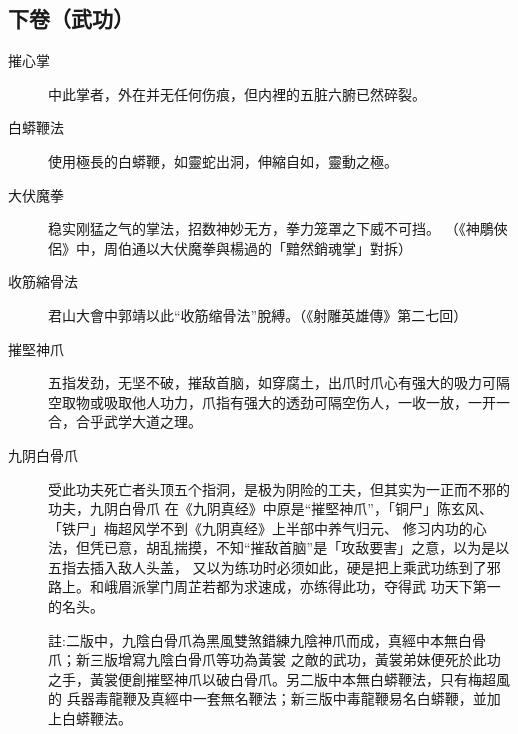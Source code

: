 \subsection{下卷（武功）}
\begin{description}
\item[摧心掌] 中此掌者，外在并无任何伤痕，但内裡的五脏六腑已然碎裂。
\item[白蟒鞭法] 使用極長的白蟒鞭，如靈蛇出洞，伸縮自如，靈動之極。
\item[大伏魔拳] 稳实刚猛之气的掌法，招数神妙无方，拳力笼罩之下威不可挡。 （《神鵰俠侶》中，周伯通以大伏魔拳與楊過的「黯然銷魂掌」對拆）
\item[收筋縮骨法] 君山大會中郭靖以此“收筋缩骨法”脫縛。（《射雕英雄傳》第二七回\cite{shediao}）
\item[摧堅神爪] 五指发劲，无坚不破，摧敌首脑，如穿腐土，出爪时爪心有强大的吸力可隔空取物或吸取他人功力，爪指有强大的透劲可隔空伤人，一收一放，一开一合，合乎武学大道之理。
\item[九阴白骨爪] 受此功夫死亡者头顶五个指洞，是极为阴险的工夫，但其实为一正而不邪的功夫，九阴白骨爪
  在《九阴真经》中原是“摧堅神爪”，「铜尸」陈玄风、「铁尸」梅超风学不到《九阴真经》上半部中养气归元、
  修习内功的心法，但凭已意，胡乱揣摸，不知“摧敌首脑”是「攻敌要害」之意，以为是以五指去插入敌人头盖，
  又以为练功时必须如此，硬是把上乘武功练到了邪路上。和峨眉派掌门周芷若都为求速成，亦练得此功，夺得武
  功天下第一的名头。

  註:二版中，九陰白骨爪為黑風雙煞錯練九陰神爪而成，真經中本無白骨爪；新三版增寫九陰白骨爪等功為黃裳
  之敵的武功，黃裳弟妹便死於此功之手，黃裳便創摧堅神爪以破白骨爪。另二版中本無白蟒鞭法，只有梅超風的
  兵器毒龍鞭及真經中一套無名鞭法；新三版中毒龍鞭易名白蟒鞭，並加上白蟒鞭法。 
\end{description}

